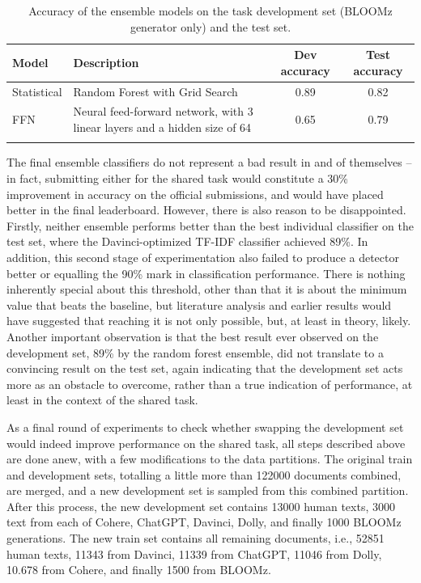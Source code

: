 \begin{table}[ht]
    \vspace{0.1cm}
    \centering
    \begin{tabular}{lp{150px}cc}
        \hline
        Model       & Description                                                               & Dev accuracy & Test accuracy \\
        \hline
        Statistical & Random Forest with Grid Search                                            & 0.89         & 0.82          \\
        FFN         & Neural feed-forward network, with 3 linear layers and a hidden size of 64 & 0.65         & 0.79          \\
        \hline
        \vspace{0.1cm}
    \end{tabular}
    \caption{Accuracy of the ensemble models on the task development set (BLOOMz generator only) and the test set.}
    \label{tab:ensemble-initial}
\end{table}

The final ensemble classifiers do not represent a bad result in and of themselves -- in fact, submitting either for the shared task would constitute a 30\% improvement in accuracy on the official submissions, and would have placed better in the final leaderboard.
However, there is also reason to be disappointed.
Firstly, neither ensemble performs better than the best individual classifier on the test set, where the Davinci-optimized TF-IDF classifier achieved 89\%.
In addition, this second stage of experimentation also failed to produce a detector better or equalling the 90\% mark in classification performance.
There is nothing inherently special about this threshold, other than that it is about the minimum value that beats the baseline, but literature analysis and earlier results would have suggested that reaching it is not only possible, but, at least in theory, likely.
Another important observation is that the best result ever observed on the development set, 89\% by the random forest ensemble, did not translate to a convincing result on the test set, again indicating that the development set acts more as an obstacle to overcome, rather than a true indication of performance, at least in the context of the shared task.

As a final round of experiments to check whether swapping the development set would indeed improve performance on the shared task, all steps described above are done anew, with a few modifications to the data partitions.
The original train and development sets, totalling a little more than 122000 documents combined, are merged, and a new development set is sampled from this combined partition.
After this process, the new development set contains 13000 human texts, 3000 text from each of Cohere, ChatGPT, Davinci, Dolly, and finally 1000 BLOOMz generations.
The new train set contains all remaining documents, i.e., 52851 human texts, 11343 from Davinci, 11339 from ChatGPT, 11046 from Dolly, 10.678 from Cohere, and finally 1500 from BLOOMz.

